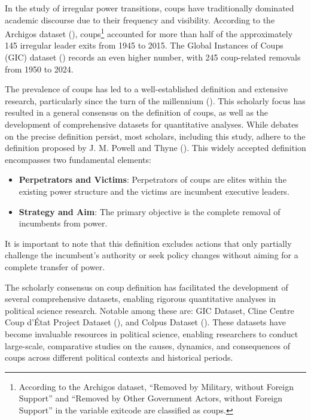 \documentclass[
  12pt,
]{report}
\begin{document}
In the study of irregular power transitions, coups have traditionally
dominated academic discourse due to their frequency and visibility.
According to the Archigos dataset (), coups\footnote{According to the Archigos
  dataset, ``Removed by Military, without Foreign Support'' and
  ``Removed by Other Government Actors, without Foreign Support'' in the
  variable exitcode are classified as coups.} accounted for more than
half of the approximately 145 irregular leader exits from 1945 to 2015.
The Global Instances of Coups (GIC) dataset
() records an even
higher number, with 245 coup-related removals from 1950 to 2024.

The prevalence of coups has led to a well-established definition and
extensive research, particularly since the turn of the millennium
(). This scholarly
focus has resulted in a general consensus on the definition of coups, as
well as the development of comprehensive datasets for quantitative
analyses. While debates on the precise definition persist, most
scholars, including this study, adhere to the definition proposed by J.
M. Powell and Thyne (). This widely
accepted definition encompasses two fundamental elements:

\begin{itemize}
\item
  \textbf{Perpetrators and Victims}: Perpetrators of coups are elites
  within the existing power structure and the victims are incumbent
  executive leaders.
\item
  \textbf{Strategy and Aim}: The primary objective is the complete
  removal of incumbents from power.
\end{itemize}

It is important to note that this definition excludes actions that only
partially challenge the incumbent's authority or seek policy changes
without aiming for a complete transfer of power.

The scholarly consensus on coup definition has facilitated the
development of several comprehensive datasets, enabling rigorous
quantitative analyses in political science research. Notable among these
are: GIC Dataset, Cline Centre Coup d'État Project Dataset
(), and Colpus Dataset
(). These datasets
have become invaluable resources in political science, enabling
researchers to conduct large-scale, comparative studies on the causes,
dynamics, and consequences of coups across different political contexts
and historical periods.
\end{document}
